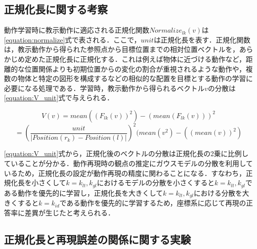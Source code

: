 \subsection{正規化長に関する考察}
\label{subsection:UNIT}
動作学習時に教示動作に適応される正規化関数$Normalize_{lk}(v)$は\ref{equation:normalize}式で表される．ここで，$unit$は正規化長を表す．正規化関数は，教示動作から得られた参照点から目標位置までの相対位置ベクトルを，あらかじめ定めた正規化長に正規化する．これは例えば物体に近づける動作など，距離的な位置関係よりも初期位置からの変化の割合が重視されるような動作や，複数の物体と特定の図形を構成するなどの相似的な配置を目標とする動作の学習に必要になる処理である．学習時，教示動作から得られるベクトル$v$の分散は\ref{equation:V_unit}式で与えられる．

\[
	V(v) = mean((F_{lk}(v))^{2}) - (mean(F_{lk}(v)))^{2}
\]
\begin{equation}
	\label{equation:V_unit}
	 = \left(\frac{unit}{| Position(r_{k})-Position(l) |}\right)^{2}(mean(v^{2}) - ((mean(v))^{2})
\end{equation}

\ref{equation:V_unit}式から，正規化後のベクトルの分散は正規化長の2乗に比例していることが分かる．動作再現時の観点の推定にガウスモデルの分散を利用しているため，正規化長の設定が動作再現の精度に関わることになる．すなわち，正規化長を小さくして$k=k_{lt} , k_{gl}$におけるモデルの分散を小さくすると$k=k_{lt} , k_{gl}$である動作を優先的に学習し，正規化長を大きくして$k=k_{lt} , k_{gl}$における分散を大きくすると$k=k_{id}$である動作を優先的に学習するため，座標系に応じて再現の正答率に差異が生じたと考えられる．

\subsection{正規化長と再現誤差の関係に関する実験}

